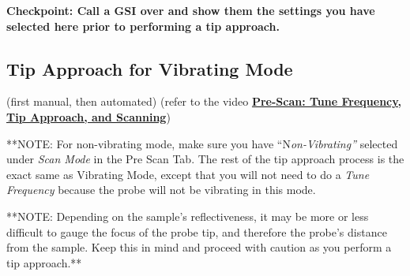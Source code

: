 \documentclass{../lab}
\begin{document}
\textbf{Checkpoint: Call a GSI over and show them the settings you have selected here prior to performing a tip approach.}

\subsection{Tip Approach for Vibrating Mode}
\label{subsec:TipApproach}

(first manual, then automated) (refer to the video \href{http://experimentationlab.berkeley.edu/sites/default/files/prescan\_final2.mp4}{\textbf{Pre-Scan: Tune Frequency, Tip Approach, and Scanning}})

**NOTE: For non-vibrating mode, make sure you have ``N\emph{on-Vibrating''} selected under \emph{Scan Mode} in the Pre Scan Tab.  The rest of the tip approach process is the exact same as Vibrating Mode, except that you will not need to do a \emph{Tune Frequency} because the probe will not be vibrating in this mode.

**NOTE: Depending on the sample's reflectiveness, it may be more or less difficult to gauge the focus of the probe tip, and therefore the probe's distance from the sample. Keep this in mind and proceed with caution as you perform a tip approach.**
\end{document}
